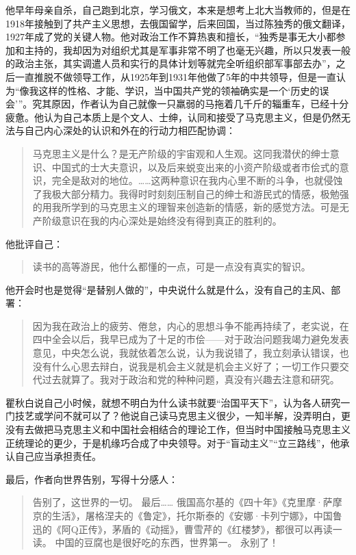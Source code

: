 他早年母亲自杀，自己跑到北京，学习俄文，本来是想考上北大当教师的，但是在1918年接触到了共产主义思想，去俄国留学，后来回国，当过陈独秀的俄文翻译，1927年成了党的关键人物。他对政治工作不算热衷和擅长，“独秀是事无大小都参加和主持的，我却因为对组织尤其是军事非常不明了也毫无兴趣，所以只发表一般的政治主张，其实调遣人员和实行的具体计划等就完全听组织部军事部去办”，之后一直推脱不做领导工作，从1925年到1931年他做了5年的中共领导，但是一直认为“像我这样的性格、才能、学识，当中国共产党的领袖确实是一个‘历史的误会’”。究其原因，作者认为自己就像一只羸弱的马拖着几千斤的辎重车，已经十分疲惫。他认为自己本质上是个文人、士绅，认同和接受了马克思主义，但是仍然无法与自己内心深处的认识和外在的行动力相匹配协调：
\begin{quotation}
马克思主义是什么？是无产阶级的宇宙观和人生观。这同我潜伏的绅士意识、中国式的士大夫意识，以及后来蜕变出来的小资产阶级或者市侩式的意识，完全是敌对的地位。……这两种意识在我内心里不断的斗争，也就侵蚀了我极大部分精力。我得时时刻刻压制自己的绅士和游民式的情感，极勉强的用我所学到的马克思主义的理智来创造新的情感，新的感觉方法。可是无产阶级意识在我的内心深处是始终没有得到真正的胜利的。
\end{quotation}
他批评自己：
\begin{quotation}
    读书的高等游民，他什么都懂的一点，可是一点没有真实的智识。
\end{quotation}
他开会时也是觉得“是替别人做的”，中央说什么就是什么，没有自己的主风、部署：
\begin{quotation}
    因为我在政治上的疲劳、倦怠，内心的思想斗争不能再持续了，老实说，在四中全会以后，我早已成为了十足的市侩——对于政治问题我竭力避免发表意见，中央怎么说，我就依着怎么说，认为我说错了，我立刻承认错误，也没有什么心思去辩白，说我是机会主义就是机会主义好了；一切工作只要交代过去就算了。我对于政治和党的种种问题，真没有兴趣去注意和研究。
\end{quotation}

瞿秋白说自己小时候，就想不明白为什么读书就要“治国平天下”，认为各人研究一门技艺或学问不就可以了？他说自己读马克思主义很少，一知半解，没弄明白，更没有去做把马克思主义和中国社会相结合的理论工作，但当时中国接触马克思主义正统理论的更少，于是机缘巧合成了中央领导。对于“盲动主义”“立三路线”，他承认自己应当承担责任。

最后，作者向世界告别，写得十分感人：
\begin{quotation}
    告别了，这世界的一切。
    最后……
    俄国高尔基的《四十年》《克里摩·萨摩京的生活》，屠格涅夫的《鲁定》，托尔斯泰的《安娜·卡列宁娜》，中国鲁迅的《阿Q正传》，茅盾的《动摇》，曹雪芹的《红楼梦》，都很可以再读一读。
    中国的豆腐也是很好吃的东西，世界第一。
    永别了！
\end{quotation}

